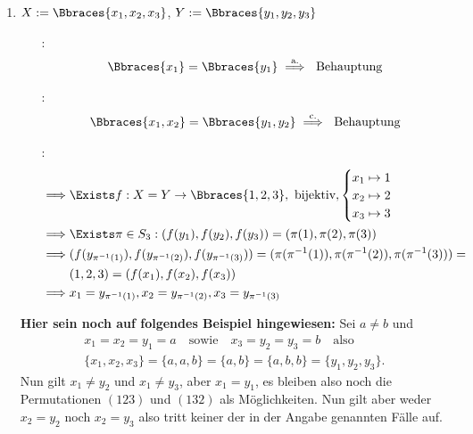 \begin{solution}
\begin{enumerate}[label = \alph*.]
    \item $X := \Bbraces{x_1, x_2, x_3}$, $Y := \Bbraces{y_1, y_2, y_3}$

    \begin{itemize}

        \item
        [\Quote{$|X| = 1$}:]
        \begin{align*}
            \Bbraces{x_1} = \Bbraces{y_1}
            \stackrel{\text{a.}}{\implies}
            ~\text{Behauptung}
        \end{align*}

        \item
        [\Quote{$|X| = 2$}:]
        \begin{align*}
            \Bbraces{x_1, x_2} = \Bbraces{y_1, y_2}
            \stackrel{\text{c.}}{\implies}
            ~\text{Behauptung}
        \end{align*}

        \item
        [\Quote{$|X| = 3$}:]
        \begin{align*}
            \implies
            & \Exists f:
            X = Y \to \Bbraces{1, 2, 3},
            ~\text{bijektiv},
            \begin{cases}
                x_1 \mapsto 1 \\
                x_2 \mapsto 2 \\
                x_3 \mapsto 3
            \end{cases} \\
            \implies
            & \Exists \pi \in S_3: (f(y_1), f(y_2), f(y_3)) = (\pi(1), \pi(2), \pi(3)) \\
            \implies
            & (f(y_{\pi^{-1}(1)}), f(y_{\pi^{-1}(2)}), f(y_{\pi^{-1}(3)})) = (\pi(\pi^{-1}(1)), \pi(\pi^{-1}(2)), \pi(\pi^{-1}(3))) = \\
            & (1, 2, 3) = (f(x_1), f(x_2), f(x_3)) \\
            \implies
            & x_1 = y_{\pi^{-1}(1)}, x_2 = y_{\pi^{-1}(2)}, x_3 = y_{\pi^{-1}(3)}
        \end{align*}

    \end{itemize}
	\textbf{Hier sein noch auf folgendes Beispiel hingewiesen:} Sei $a \neq b$ und 
	\begin{align*}
	x_1 = x_2 = y_1 = a \quad \text{sowie} \quad x_3 = y_2 = y_3 = b \quad \text{also} \quad \\
	\{x_1, x_2, x_3\} = \{a,a,b\} = \{a,b\}  = \{a,b,b\} = \{y_1, y_2, y_3\}.
	\end{align*}
	Nun gilt $x_1 \neq y_2$ und $x_1 \neq y_3$, aber $x_1 = y_1$, es bleiben also noch die Permutationen $(123)$ und $(132)$ als Möglichkeiten. Nun gilt aber weder $x_2 = y_2$ noch $x_2 = y_3$ also tritt keiner der in der Angabe genannten Fälle auf.
\end{enumerate}

\end{solution}

